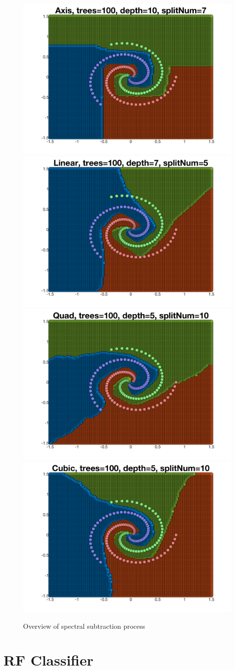 \documentclass[a4paper,pra,twocolumn,10pt,aps,longbibliography,nobalancelastpage]{revtex4-1}
\begin{document}
\begin{figure}[H]
	\centering
    \includegraphics[width=0.40\columnwidth]{axis}
	\includegraphics[width=0.40\columnwidth]{linear}
    \includegraphics[width=0.40\columnwidth]{quad}
    \includegraphics[width=0.40\columnwidth]{cubic}
    \caption{Overview of spectral subtraction process}
\end{figure}



\section{RF Classifier}
\end{document}
